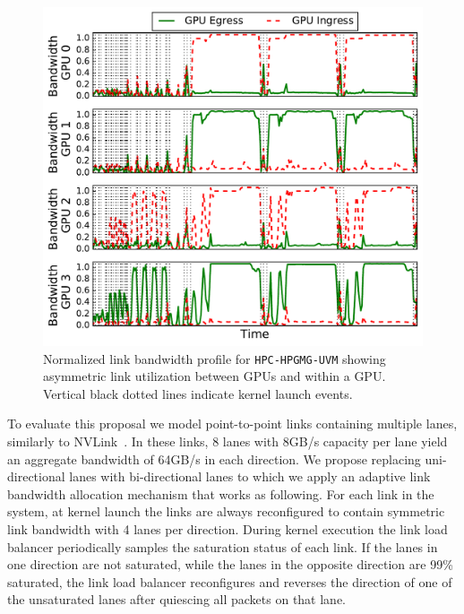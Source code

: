 \begin{figure}[t]
	\centering
	
	\includegraphics[width=1.0\columnwidth]{figures/bw_profile_HPGMG_UVM_base.pdf}
	\caption{Normalized link bandwidth profile for \texttt{HPC-HPGMG-UVM} 
		showing asymmetric link utilization between GPUs and within a GPU. Vertical black 
		dotted lines indicate kernel launch events.}
	\label{fig:link-motivation}
	\vspace{-.25in}
\end{figure}

To evaluate this proposal we model point-to-point links containing multiple 
lanes, similarly to NVLink~\cite{pascal-tesla-wp}. In these links, 8 
lanes with 8GB/s capacity per lane yield an aggregate bandwidth of 64GB/s in 
each direction. We propose replacing uni-directional lanes with bi-directional 
lanes to which we apply an adaptive link bandwidth allocation mechanism that 
works as following. For each link in the system, at kernel launch the links are 
always reconfigured to contain symmetric link bandwidth with 4 lanes per 
direction. During kernel execution the link load balancer periodically samples 
the saturation status of each link. If the lanes in one direction are not 
saturated, while the lanes in the opposite direction are 99\% saturated, the 
link load balancer reconfigures and reverses the direction of one of the 
unsaturated lanes after quiescing all packets on that lane. 

